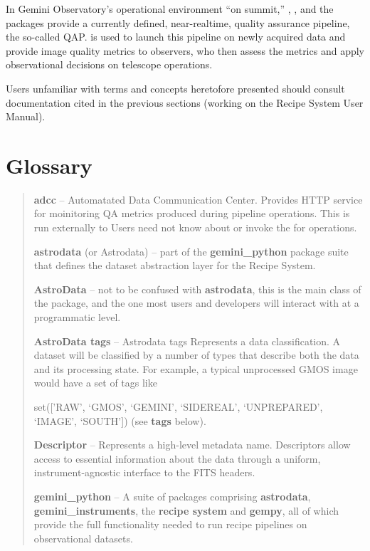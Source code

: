 \documentclass[letterpaper,10pt,english]{sphinxmanual}
\begin{document}
In Gemini Observatory's operational environment ``on summit,'' ,
, and the  packages provide a currently defined,
near-realtime, quality assurance pipeline, the so-called QAP.  is used
to launch this pipeline on newly acquired data and provide image quality metrics
to observers, who then assess the metrics and apply observational decisions on
telescope operations.

Users unfamiliar with terms and concepts heretofore presented should consult
documentation cited in the previous sections (working on the Recipe System User
Manual).


\section{Glossary}
\label{intro:glossary}\begin{quote}

\textbf{adcc} -- Automatated Data Communication Center. Provides  HTTP
service for moinitoring QA metrics produced during pipeline operations.
This is run externally to  Users need not know about or invoke
the  for  operations.

\textbf{astrodata} (or Astrodata) -- part of the \textbf{gemini\_python} package suite
that defines the dataset abstraction layer for the Recipe System.

\textbf{AstroData} -- not to be confused with \textbf{astrodata}, this is the main class
of the  package, and the one most users and developers will
interact with at a programmatic level.

\textbf{AstroData tags} -- Astrodata tags Represents a data classification. A dataset
will be classified by a number of types that describe both the data and its
processing state. For example, a typical unprocessed GMOS image would have a
set of tags like

set({[}'RAW', `GMOS', `GEMINI', `SIDEREAL', `UNPREPARED', `IMAGE', `SOUTH'{]})
(see \textbf{tags} below).

\textbf{Descriptor} -- Represents a high-level metadata name. Descriptors allow
access to essential information about the data through a uniform,
instrument-agnostic interface to the FITS headers.

\textbf{gemini\_python} -- A suite of packages comprising \textbf{astrodata},
\textbf{gemini\_instruments}, the \textbf{recipe system} and \textbf{gempy}, all of which
provide the full functionality needed to run recipe  pipelines on
observational datasets.


\end{quote}
\end{document}
